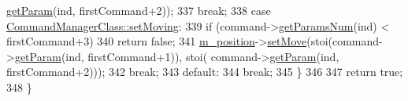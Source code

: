 \begin{DoxyCode}
      \hyperlink{class_command_class_ac5cd41b5644c2a0b076b3e7f18b79b1a}{getParam}(ind, firstCommand+2));
337         \textcolor{keywordflow}{break};
338     \textcolor{keywordflow}{case} \hyperlink{class_command_manager_class_aff5b4b6301c24b585b22c6abaf4f3131a9d650977fcb53bad856cc8d8d43b6e67}{CommandManagerClass::setMoving}:
339         \textcolor{keywordflow}{if} (command->\hyperlink{class_command_class_ab987d47061d86a89765dbf8a2eda146f}{getParamsNum}(ind) < firstCommand+3)
340             \textcolor{keywordflow}{return} \textcolor{keyword}{false};
341         \hyperlink{class_system_class_a50f3aa02021aa6813bc2e30dfcb8d8ae}{m\_position}->\hyperlink{class_position_class_ab710ce7a18e9102c8e9d83ad46d876c4}{setMove}(stoi(command->\hyperlink{class_command_class_ac5cd41b5644c2a0b076b3e7f18b79b1a}{getParam}(ind, firstCommand+1)), stoi(
      command->\hyperlink{class_command_class_ac5cd41b5644c2a0b076b3e7f18b79b1a}{getParam}(ind, firstCommand+2)));
342         \textcolor{keywordflow}{break};
343     \textcolor{keywordflow}{default}:
344         \textcolor{keywordflow}{break};
345     \}
346 
347     \textcolor{keywordflow}{return} \textcolor{keyword}{true};
348 \}
\end{DoxyCode}
